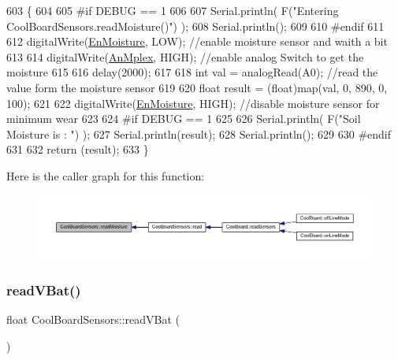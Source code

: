 \begin{DoxyCode}
603 \{
604 
605 \textcolor{preprocessor}{#if DEBUG == 1}
606     
607     Serial.println( F(\textcolor{stringliteral}{"Entering CoolBoardSensors.readMoisture()"}) );
608     Serial.println();
609     
610 \textcolor{preprocessor}{#endif}
611 
612     digitalWrite(\hyperlink{classCoolBoardSensors_a6177d02e14a057a2f171a2e930b5038d}{EnMoisture}, LOW);                 \textcolor{comment}{//enable moisture sensor and waith a bit}
613 
614     digitalWrite(\hyperlink{classCoolBoardSensors_a12ef28b1046219e0aee10bf64e28c4a5}{AnMplex}, HIGH);         \textcolor{comment}{//enable analog Switch to get the moisture}
615 
616     delay(2000);
617 
618     \textcolor{keywordtype}{int} val = analogRead(A0);                       \textcolor{comment}{//read the value form the moisture sensor}
619 
620     \textcolor{keywordtype}{float} result = (float)map(val, 0, 890, 0, 100); 
621 
622     digitalWrite(\hyperlink{classCoolBoardSensors_a6177d02e14a057a2f171a2e930b5038d}{EnMoisture}, HIGH);                  \textcolor{comment}{//disable moisture sensor for minimum wear}
623     
624 \textcolor{preprocessor}{#if DEBUG == 1 }
625 
626     Serial.println( F(\textcolor{stringliteral}{"Soil Moisture is : "}) );
627     Serial.println(result);
628     Serial.println();
629 
630 \textcolor{preprocessor}{#endif }
631 
632     \textcolor{keywordflow}{return} (result);
633 \}
\end{DoxyCode}
Here is the caller graph for this function\+:\nopagebreak
\begin{figure}[H]
\begin{center}
\leavevmode
\includegraphics[width=350pt]{classCoolBoardSensors_a8761bff50373c485f4465c8db47d0633_icgraph}
\end{center}
\end{figure}
\mbox{\label{classCoolBoardSensors_a6944b6ea7bce8e2fce1b434acfd9d5f3}} 
\subsubsection{\texorpdfstring{read\+V\+Bat()}{readVBat()}}
{\footnotesize\ttfamily float Cool\+Board\+Sensors\+::read\+V\+Bat (\begin{DoxyParamCaption}{ }\end{DoxyParamCaption})}

